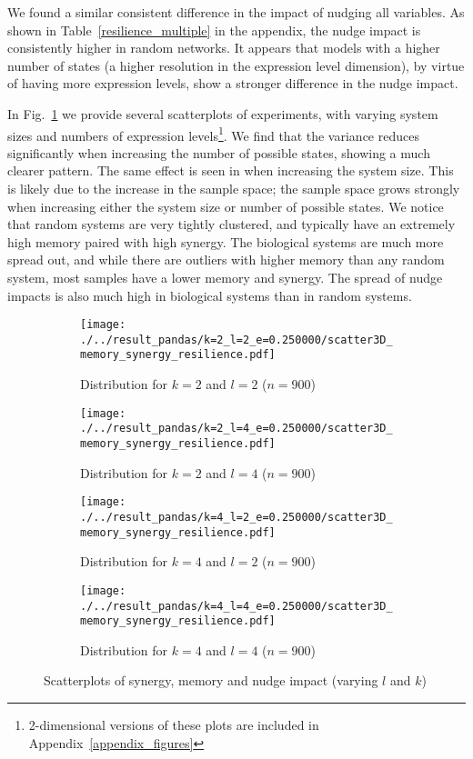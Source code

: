 \documentclass[../main.tex]{subfiles}
\begin{document}
We found a similar consistent difference in the impact of nudging all variables.
As shown in Table~\ref{resilience_multiple} in the appendix, the nudge impact is consistently higher in random networks.
It appears that models with a higher number of states (a higher resolution in the expression level dimension), by virtue of having more expression levels, show a stronger difference in the nudge impact.

In Fig.~\ref{fig:3dscatter} we provide several scatterplots of experiments, with varying system sizes and numbers of expression levels\footnote{2-dimensional versions of these plots are included in Appendix~\ref{appendix_figures}}.
We find that the variance reduces significantly when increasing the number of possible states, showing a much clearer pattern.
The same effect is seen in when increasing the system size.
This is likely due to the increase in the sample space; the sample space grows strongly when increasing either the system size or number of possible states.
We notice that random systems are very tightly clustered, and typically have an extremely high memory paired with high synergy.
The biological systems are much more spread out, and while there are outliers with higher memory than any random system, most samples have a lower memory and synergy.
The spread of nudge impacts is also much high in biological systems than in random systems.

\begin{figure}[H]
    \centering
    \begin{subfigure}[b]{0.45\textwidth}
        \texttt{[image: ./../result\_pandas/k=2\_l=2\_e=0.250000/scatter3D\_memory\_synergy\_resilience.pdf]}
        \caption{Distribution for $k=2$ and $l=2$ ($n=900$)}
    \end{subfigure}
    \begin{subfigure}[b]{0.45\textwidth}
        \texttt{[image: ./../result\_pandas/k=2\_l=4\_e=0.250000/scatter3D\_memory\_synergy\_resilience.pdf]}
        \caption{Distribution for $k=2$ and $l=4$ ($n=900$)}
    \end{subfigure}
\bigskip
    \begin{subfigure}[b]{0.45\textwidth}
        \texttt{[image: ./../result\_pandas/k=4\_l=2\_e=0.250000/scatter3D\_memory\_synergy\_resilience.pdf]}
        \caption{Distribution for $k=4$ and $l=2$ ($n=900$)}
    \end{subfigure}
    \begin{subfigure}[b]{0.45\textwidth}
        \texttt{[image: ./../result\_pandas/k=4\_l=4\_e=0.250000/scatter3D\_memory\_synergy\_resilience.pdf]}
        \caption{Distribution for $k=4$ and $l=4$ ($n=900$)}
    \end{subfigure}
    \caption{Scatterplots of synergy, memory and nudge impact (varying $l$ and $k$)}
    \label{fig:3dscatter}
\end{figure}
\end{document}
